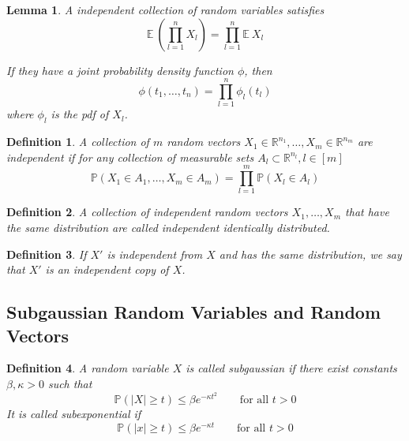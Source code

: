 \documentclass[10pt,a4paper]{article}
\theoremstyle{thmstyle}
\newtheorem{definition}{Definition}
\newtheorem{lemma}{Lemma}
\newcommand{\E}{\mathbb{E}~}
\renewcommand{\Pr}[1]{\mathbb{P}\left( #1 \right)}
\begin{document}
\begin{lemma}
  A independent collection of random variables satisfies
  \begin{equation*}
    \E \left( \prod_{l = 1}^{n} X_{l} \right) = \prod_{l = 1}^{n} \E X_{l}
  \end{equation*}

  If they have a joint probability density function $\phi$, then
  \begin{equation*}
    \phi(t_{1}, \dots, t_{n}) = \prod_{l = 1}^{n} \phi_{l}(t_{l})
  \end{equation*}
  where $\phi_{l}$ is the pdf of $X_{l}$.
\end{lemma}

\begin{definition}
  A collection of $m$ random vectors $X_{1} \in \mathbb{R}^{n_{1}}, \dots, X_{m} \in \mathbb{R}^{n_{m}}$ are independent if for any collection of measurable sets $A_{l} \subset \mathbb{R}^{n_{l}}, l \in [m]$
  \begin{equation*}
    \Pr{X_{1} \in A_{1}, \dots, X_{m} \in A_{m}} = \prod_{l = 1}^{m} \Pr{X_{l} \in A_{l}}
  \end{equation*}
\end{definition}

\begin{definition}
  A collection of independent random vectors $X_{1}, \dots, X_{m}$ that have the same distribution are called independent identically distributed.
\end{definition}

\begin{definition}
  If $X'$ is independent from $X$ and has the same distribution, we say that $X'$ is an \emph{independent copy} of $X$.
\end{definition}

\subsection{Subgaussian Random Variables and Random Vectors}

\begin{definition}
  A random variable $X$ is called \emph{subgaussian} if there exist constants $\beta, \kappa > 0$ such that
  \begin{equation*}
    \Pr{|X| \ge t} \le \beta e^{-\kappa t^{2}} \qquad \text{for all $t > 0$}
  \end{equation*}
  It is called \emph{subexponential} if
  \begin{equation*}
    \Pr{|x| \ge t} \le \beta e^{-\kappa t} \qquad \text{for all $t > 0$}
  \end{equation*}
\end{definition}
\end{document}
